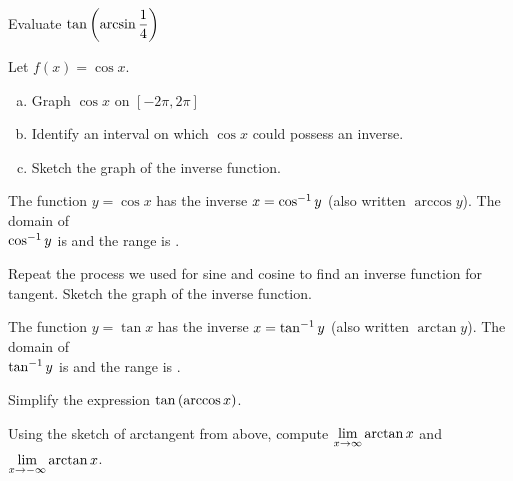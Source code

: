 \documentclass[notes]{subfiles}
\begin{document}
		\begin{ex}
			Evaluate $\tan\left( \arcsin \dfrac{1}{4}\right)$
		\end{ex}
		
		\begin{ex}
			Let $f(x) = \cos x$.
			\begin{enumerate}[(a)]
				\item Graph $\cos x$ on $[-2\pi, 2\pi]$
					
				\item Identify an interval on which $\cos x$ could possess an inverse.
					
				\item Sketch the graph of the inverse function.
					
			\end{enumerate}
		\end{ex}	
		\newpage
		
		\begin{rmk}
			The function $y = \cos x$ has the inverse $x = \cos^{-1}y$ (also written $\arccos y$).  The domain of \\[20pt] $\cos^{-1} y$ is  and the range is \blank{2.5}.
		\end{rmk}
		
		\begin{ex}
			Repeat the process we used for sine and cosine to find an inverse function for tangent.  Sketch the graph of the inverse function.
		\end{ex}
			\vs{1}
			
		\begin{rmk}
			The function $y = \tan x$ has the inverse $x = \tan^{-1}y$ (also written $\arctan y$).  The domain of \\[20pt] $\tan^{-1}y$ is  and the range is \blank{2.5}.  
		\end{rmk}
		
		\begin{ex}
			Simplify the expression $\tan\left( \arccos x\right)$.
		\end{ex}
			\vs{.5}
			
		\begin{ex}
			Using the sketch of arctangent from above, compute $\displaystyle\lim_{x\to \infty} \arctan x$ and $\displaystyle\lim_{x\to -\infty} \arctan x$.
		\end{ex}
			\vs{.5}
			\newpage
			
\end{document}
